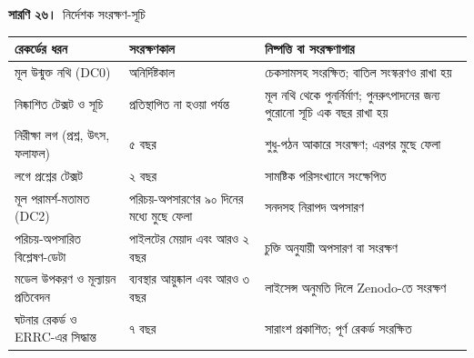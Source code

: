 \documentclass[border=10pt]{standalone}
\begin{document}
\begin{minipage}{17cm}
{\large\bfseries সারণি ২৬।}\ {\large নির্দেশক সংরক্ষণ-সূচি}\par\vspace{7pt}
\small
{}
\begin{tabularx}{\linewidth}{@{}>{\hsize=1.040\hsize\raggedright\arraybackslash}X>{\hsize=0.920\hsize\raggedright\arraybackslash}X>{\hsize=1.040\hsize\raggedright\arraybackslash}X@{}}
\arrayrulecolor{bapilrule}\toprule
\rowcolor{white}\textbf{রেকর্ডের ধরন} & \textbf{সংরক্ষণকাল} & \textbf{নিষ্পত্তি বা সংরক্ষণাগার} \\
\midrule
মূল উন্মুক্ত নথি (DC0) & অনির্দিষ্টকাল & চেকসামসহ সংরক্ষিত; বাতিল সংস্করণও রাখা হয় \\
নিষ্কাশিত টেক্সট ও সূচি & প্রতিস্থাপিত না হওয়া পর্যন্ত & মূল নথি থেকে পুনর্নির্মাণ; পুনরুৎপাদনের জন্য পুরোনো সূচি এক বছর রাখা হয় \\
নিরীক্ষা লগ (প্রশ্ন, উৎস, ফলাফল) & ৫ বছর & শুধু-পঠন আকারে সংরক্ষণ; এরপর মুছে ফেলা \\
লগে প্রশ্নের টেক্সট & ২ বছর & সামষ্টিক পরিসংখ্যানে সংক্ষেপিত \\
মূল পরামর্শ-মতামত (DC2) & পরিচয়-অপসারণের ৯০ দিনের মধ্যে মুছে ফেলা & সনদসহ নিরাপদ অপসারণ \\
পরিচয়-অপসারিত বিশ্লেষণ-ডেটা & পাইলটের মেয়াদ এবং আরও ২ বছর & চুক্তি অনুযায়ী অপসারণ বা সংরক্ষণ \\
মডেল উপকরণ ও মূল্যায়ন প্রতিবেদন & ব্যবস্থার আয়ুষ্কাল এবং আরও ৩ বছর & লাইসেন্স অনুমতি দিলে Zenodo-তে সংরক্ষণ \\
ঘটনার রেকর্ড ও ERRC-এর সিদ্ধান্ত & ৭ বছর & সারাংশ প্রকাশিত; পূর্ণ রেকর্ড সংরক্ষিত \\
\bottomrule
\end{tabularx}
\par\vspace{5pt}{\footnotesize\itshape ব্যক্তিগত উপাত্ত সুরক্ষা আইন, ২০২৬, জাতীয় উপাত্ত ব্যবস্থাপনা আইন, ২০২৬ ও এগুলোর অধীনে জারিকৃত বিধিমালার আলোকে আইনি পর্যালোচনা সাপেক্ষ।}
\par{}
\end{minipage}
\end{document}
